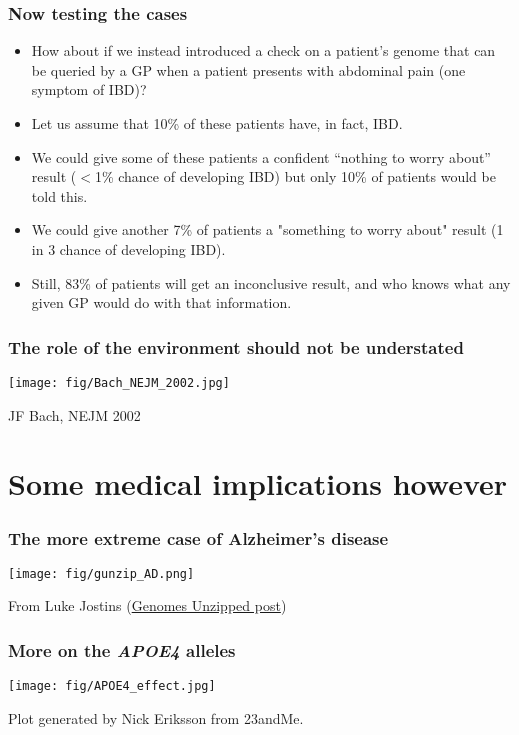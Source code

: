 \documentclass{beamer}
\begin{document}
\begin{frame}
  \frametitle{Now testing the cases}
  \begin{itemize} 
  \item How about if we instead introduced a check on a patient’s genome that can be queried by a GP when a patient presents with abdominal pain (one symptom of IBD)?
  \item Let us assume that 10\% of these patients have, in fact, IBD.
  \item We could give some of these patients a confident “nothing to worry about” result ($<$1\% chance of developing IBD) but only 10\% of patients would be told this.
  \item We could give another 7\% of patients a "something to worry about" result (1 in 3 chance of developing IBD).
  \item Still, 83\% of patients will get an inconclusive result, and who knows what any given GP would do with that information.
  \end{itemize}
\end{frame}


\begin{frame}
  \frametitle{The role of the environment should not be understated}
  \begin{center} 
    \texttt{[image: fig/Bach\_NEJM\_2002.jpg]}
  \end{center}
  JF Bach, NEJM 2002
\end{frame}


\section{Some medical implications however}


\begin{frame}
  \frametitle{The more extreme case of Alzheimer's disease}
  \begin{center} 
    \texttt{[image: fig/gunzip\_AD.png]}
  \end{center}
  From Luke Jostins (\href{http://www.genomesunzipped.org/2011/05/calculating-your-alzheimers-risk.php}{Genomes Unzipped post}) 
\end{frame}



\begin{frame}
  \frametitle{More on the {\it APOE4} alleles}
  \begin{center} 
    \texttt{[image: fig/APOE4\_effect.jpg]}
  \end{center}
  Plot generated by Nick Eriksson from 23andMe.
\end{frame}
\end{document}

